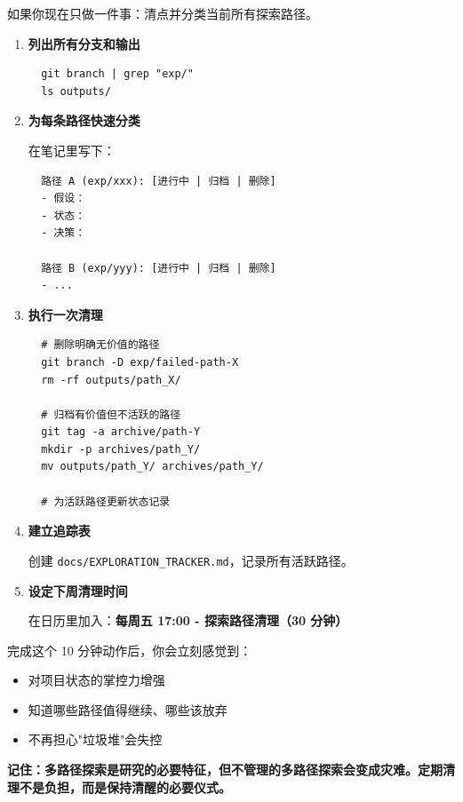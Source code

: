 如果你现在只做一件事：清点并分类当前所有探索路径。

\begin{enumerate}
  \item \textbf{列出所有分支和输出}
  \begin{verbatim}
  git branch | grep "exp/"
  ls outputs/
  \end{verbatim}

  \item \textbf{为每条路径快速分类}

  在笔记里写下：
  \begin{verbatim}
  路径 A (exp/xxx): [进行中 | 归档 | 删除]
  - 假设：
  - 状态：
  - 决策：

  路径 B (exp/yyy): [进行中 | 归档 | 删除]
  - ...
  \end{verbatim}

  \item \textbf{执行一次清理}

  \begin{verbatim}
  # 删除明确无价值的路径
  git branch -D exp/failed-path-X
  rm -rf outputs/path_X/

  # 归档有价值但不活跃的路径
  git tag -a archive/path-Y
  mkdir -p archives/path_Y/
  mv outputs/path_Y/ archives/path_Y/

  # 为活跃路径更新状态记录
  \end{verbatim}

  \item \textbf{建立追踪表}

  创建 \texttt{docs/EXPLORATION\_TRACKER.md}，记录所有活跃路径。

  \item \textbf{设定下周清理时间}

  在日历里加入：\textbf{每周五 17:00 - 探索路径清理（30 分钟）}
\end{enumerate}

完成这个 10 分钟动作后，你会立刻感觉到：
\begin{itemize}
  \item 对项目状态的掌控力增强
  \item 知道哪些路径值得继续、哪些该放弃
  \item 不再担心"垃圾堆"会失控
\end{itemize}

\textbf{记住：多路径探索是研究的必要特征，但不管理的多路径探索会变成灾难。定期清理不是负担，而是保持清醒的必要仪式。}
